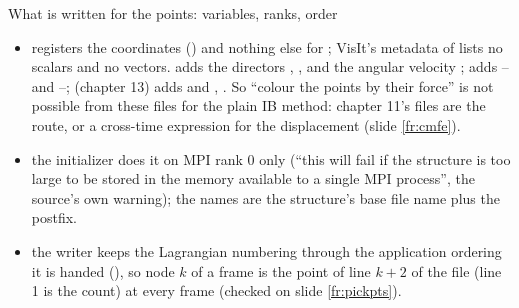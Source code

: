 \documentclass[aspectratio=169,11pt]{beamer}
\begin{document}
\begin{frame}{What is written for the points: variables, ranks, order}
\label{fr:silo2b}
\footnotesize
\begin{itemize}
  \item {}  registers the coordinates () and nothing else for ; VisIt's metadata of  lists no scalars and no vectors.  adds the directors , ,  and the angular velocity ;  adds -- and --;  (chapter 13) adds  and ,  . So ``colour the points by their force'' is not possible from these files for the plain IB method: chapter 11's  files are the route, or a cross-time expression for the displacement (slide \ref{fr:cmfe}).
  \item {} the initializer does it on MPI rank 0 only (``this will fail if the structure is too large to be stored in the memory available to a single MPI process'', the source's own warning); the names are the structure's base file name plus the postfix.
  \item {} the writer keeps the Lagrangian numbering through the application ordering it is handed (), so node $k$ of a frame is the point of line $k+2$ of the  file (line 1 is the count) at every frame (checked on slide \ref{fr:pickpts}).
\end{itemize}
\end{frame}
\end{document}
